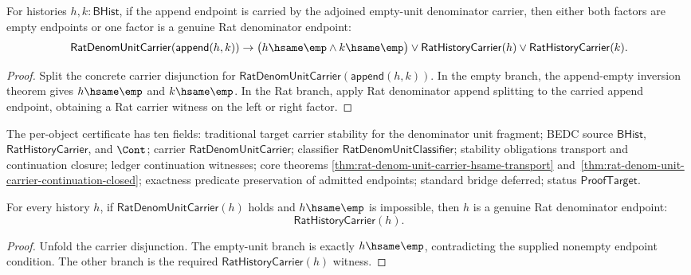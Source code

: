 \begin{theorem}
\label{thm:rat-denom-unit-carrier-append-branch-cases}
For histories $h,k:\mathsf{BHist}$, if the append endpoint is carried by the
adjoined empty-unit denominator carrier, then either both factors are empty
endpoints or one factor is a genuine Rat denominator endpoint:
$$
\mathsf{RatDenomUnitCarrier}(\mathsf{append}(h,k))
\to
\bigl(h\hsame\emp\land k\hsame\emp\bigr)
\lor
\mathsf{RatHistoryCarrier}(h)
\lor
\mathsf{RatHistoryCarrier}(k).
$$
\end{theorem}
\begin{proof}
Split the concrete carrier disjunction for
$\mathsf{RatDenomUnitCarrier}(\mathsf{append}(h,k))$. In the empty branch,
the append-empty inversion theorem gives $h\hsame\emp$ and $k\hsame\emp$.
In the Rat branch, apply Rat denominator append splitting to the carried
append endpoint, obtaining a Rat carrier witness on the left or right factor.
\end{proof}

The per-object certificate has ten fields: traditional target carrier stability
for the denominator unit fragment; BEDC source $\mathsf{BHist}$,
$\mathsf{RatHistoryCarrier}$, and $\Cont$; carrier
$\mathsf{RatDenomUnitCarrier}$; classifier
$\mathsf{RatDenomUnitClassifier}$; stability obligations transport and
continuation closure; ledger continuation witnesses; core theorems
\ref{thm:rat-denom-unit-carrier-hsame-transport}
and~\ref{thm:rat-denom-unit-carrier-continuation-closed}; exactness predicate
preservation of admitted endpoints; standard bridge deferred; status
$\mathsf{ProofTarget}$.

\begin{theorem}
\label{thm:rat-denom-unit-carrier-nonempty-rat}
For every history $h$, if $\mathsf{RatDenomUnitCarrier}(h)$ holds and
$h\hsame\emp$ is impossible, then $h$ is a genuine Rat denominator endpoint:
$$
\mathsf{RatHistoryCarrier}(h).
$$
\end{theorem}
\begin{proof}
Unfold the carrier disjunction. The empty-unit branch is exactly
$h\hsame\emp$, contradicting the supplied nonempty endpoint condition. The
other branch is the required $\mathsf{RatHistoryCarrier}(h)$ witness.
\end{proof}

